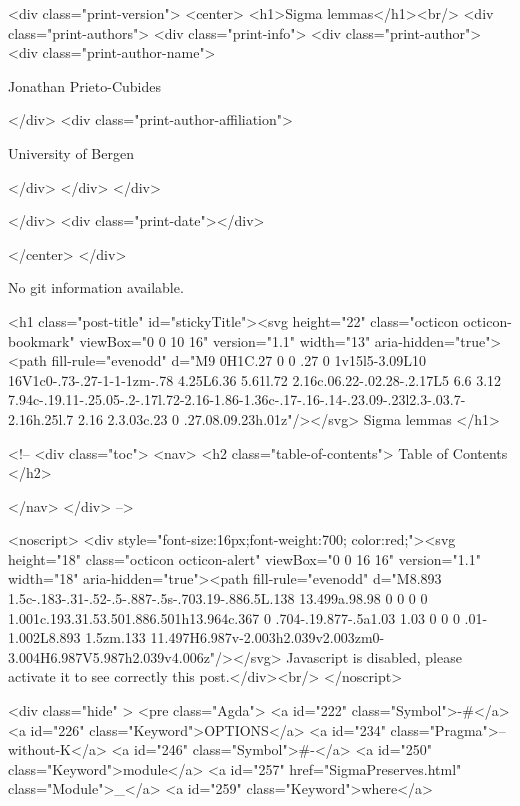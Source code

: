   <div class="print-version">
    <center>
      <h1>Sigma lemmas</h1><br/>
        <div class="print-authors">
          <div class="print-info">
            <div class="print-author">
              <div class="print-author-name">
                
                  Jonathan Prieto-Cubides
                
              </div>
              <div class="print-author-affiliation">
                
                  University of Bergen
                
                </div>
            </div>
          </div>
          
          
        </div>
        <div class="print-date"></div>
        
        
    </center>
  </div>

  
  No git information available.
  
  <h1 class="post-title" id="stickyTitle"><svg height="22" class="octicon octicon-bookmark" viewBox="0 0 10 16" version="1.1" width="13" aria-hidden="true"><path fill-rule="evenodd" d="M9 0H1C.27 0 0 .27 0 1v15l5-3.09L10 16V1c0-.73-.27-1-1-1zm-.78 4.25L6.36 5.61l.72 2.16c.06.22-.02.28-.2.17L5 6.6 3.12 7.94c-.19.11-.25.05-.2-.17l.72-2.16-1.86-1.36c-.17-.16-.14-.23.09-.23l2.3-.03.7-2.16h.25l.7 2.16 2.3.03c.23 0 .27.08.09.23h.01z"/></svg> Sigma lemmas
  </h1>

  <!-- 
  <div class="toc">
    <nav>
    <h2 class="table-of-contents"> Table of Contents </h2>
      

    </nav>
  </div>
   -->

  <noscript>
  <div style="font-size:16px;font-weight:700; color:red;"><svg height="18" class="octicon octicon-alert" viewBox="0 0 16 16" version="1.1" width="18" aria-hidden="true"><path fill-rule="evenodd" d="M8.893 1.5c-.183-.31-.52-.5-.887-.5s-.703.19-.886.5L.138 13.499a.98.98 0 0 0 0 1.001c.193.31.53.501.886.501h13.964c.367 0 .704-.19.877-.5a1.03 1.03 0 0 0 .01-1.002L8.893 1.5zm.133 11.497H6.987v-2.003h2.039v2.003zm0-3.004H6.987V5.987h2.039v4.006z"/></svg> Javascript is disabled, please activate it to see correctly this post.</div><br/>
  </noscript>

  <div class="hide" >
<pre class="Agda">
<a id="222" class="Symbol">{-#</a> <a id="226" class="Keyword">OPTIONS</a> <a id="234" class="Pragma">--without-K</a> <a id="246" class="Symbol">#-}</a>
<a id="250" class="Keyword">module</a> <a id="257" href="SigmaPreserves.html" class="Module">_</a> <a id="259" class="Keyword">where</a>

